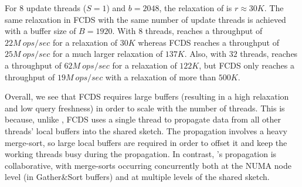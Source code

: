 For $8$ update threads ($S=1$) and $b=2048$, the relaxation of \mysketch is $r\approx 30K$. The same relaxation in FCDS with the same number of update threads is achieved with a buffer size of $B=1920$.
With $8$ threads, \mysketch reaches a throughput of $22M\ ops/sec$ for a relaxation of $30K$ whereas FCDS reaches a throughput of $25M\ ops/sec$ for a much larger relaxation of $137K$. Also, with $32$ threads, \mysketch reaches a throughput of $62M\ ops/sec$ for a relaxation of $122K$, but FCDS only reaches a throughput of $19M\ ops/sec$ with a relaxation of more than $500K$.

Overall, we see that FCDS requires large buffers (resulting in a high relaxation and low query freshness) in order to scale with the number of threads. This is because, unlike \mysketch, FCDS uses a single thread to propagate data from all other threads' local buffers into the shared sketch. The propagation involves a heavy merge-sort, so large local buffers are required in order to offset it and keep the working threads busy during the propagation. In contrast, \mysketch's propagation is collaborative, with merge-sorts occurring concurrently both at the NUMA node level (in Gather\&Sort buffers) and at multiple levels of the shared sketch.




